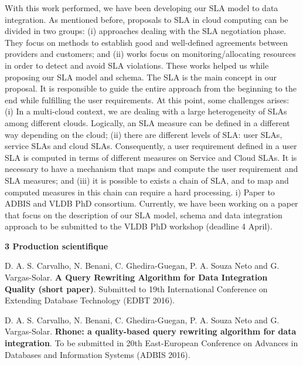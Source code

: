 \documentclass[11pt,a4paper,oneside]{report}
\begin{document}
With this work performed, we have been developing our SLA model to data integration. As mentioned before, proposals to SLA in cloud computing can be divided in two groups: (i) approaches dealing with the SLA negotiation phase. They focus on methods to establish good and well-defined agreements between providers and customers; and (ii) works focus on monitoring/allocating resources in order to detect and avoid SLA violations. These works helped us while proposing our SLA model and schema. The SLA is the main concept in our proposal. It is responsible to guide the entire approach from the beginning to the end while fulfilling the user requirements. At this point, some challenges arises: (i) In a multi-cloud context, we are dealing with a large heterogeneity of SLAs among different clouds. Logically, an SLA measure can be defined in a different way depending on the cloud; (ii) there are different levels of SLA: user SLAs, service SLAs and cloud SLAs. Consequently, a user requirement defined in a user SLA is computed in terms of different measures on Service and Cloud SLAs. It is necessary to have a mechanism that maps and compute the user requirement and SLA measures; and (iii) it is possible to exists a chain of SLA, and to map and computed measures in this chain can require a hard processing. i) Paper to ADBIS and VLDB PhD consortium. Currently, we have been working on a paper that focus on the description of our SLA model, schema and data integration approach to be submitted to the VLDB PhD workshop (deadline 4 April).


\newpage
\begin{flushleft}
\textbf{3 Production scientifique}\\
\end{flushleft}

\noindent
D. A. S. Carvalho, N. Benani, C. Ghedira-Guegan, P. A. Souza Neto and G. Vargas-Solar. \textbf{A Query Rewriting Algorithm for Data Integration Quality (short paper)}. Submitted to 19th International Conference on Extending Database Technology (EDBT 2016).
\bigskip

\noindent
D. A. S. Carvalho, N. Benani, C. Ghedira-Guegan, P. A. Souza Neto and G. Vargas-Solar. \textbf{Rhone: a quality-based query rewriting algorithm for data integration}. To be submitted in 20th East-European Conference on Advances in Databases and Information Systems (ADBIS 2016).
\bigskip
\end{document}
